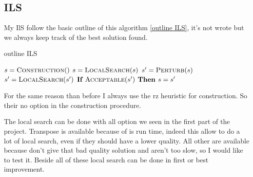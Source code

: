 \documentclass[12pt,a4paper]{article}
\begin{document}
\subsection{ILS}

My IlS follow the basic outline of this algorithm \ref{outline ILS}, it's not wrote but we always keep track of the best solution found.

\begin{algorithm}
\caption{outline ILS}
\begin{algorithmic}[1]
\State $s = \Call{Construction}$
\State $s = \Call{LocalSearch}{s}$
	\State $s' = \Call{Perturb}{s}$
	\State $s' = \Call{LocalSearch}{s'}$
	\State $\textbf{If } \Call{Acceptable}{s'} \textbf{ Then } s = s'$
\EndWhile	
\EndProcedure
\end{algorithmic}
\label{outline ILS}
\end{algorithm}

For the same reason than before I always use the rz heuristic for construction. So their no option in the construction procedure.

The local search can be done with all option we seen in the first part of the project. Transpose is available because of is run time, indeed this allow to do a lot of local search, even if they should have a lower quality. All other are available because don't give that bad quality solution and aren't too slow, so I would like to test it. Beside all of these local search can be done in first or best improvement.
\end{document}
